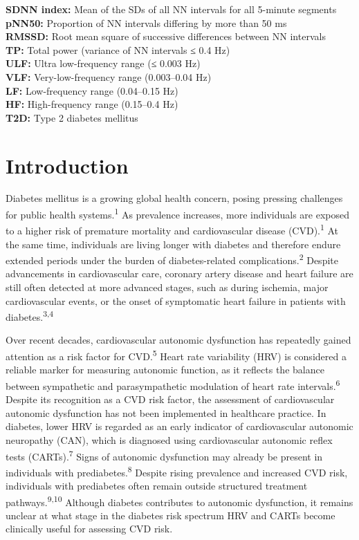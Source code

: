 \documentclass[
  letterpaper,
  headsepline=true,
  open=any]{scrbook}
\begin{document}
\textbf{SDNN index:} Mean of the SDs of all NN intervals for all
5-minute segments\\
\textbf{pNN50:} Proportion of NN intervals differing by more than 50
ms\\
\textbf{RMSSD:} Root mean square of successive differences between NN
intervals\\
\textbf{TP:} Total power (variance of NN intervals ≤ 0.4 Hz)\\
\textbf{ULF:} Ultra low-frequency range (≤ 0.003 Hz)\\
\textbf{VLF:} Very-low-frequency range (0.003--0.04 Hz)\\
\textbf{LF:} Low-frequency range (0.04--0.15 Hz)\\
\textbf{HF:} High-frequency range (0.15--0.4 Hz)\\
\textbf{T2D:} Type 2 diabetes mellitus


\hypertarget{introduction}{%
\chapter{Introduction}\label{introduction}}

\newpage

Diabetes mellitus is a growing global health concern, posing pressing
challenges for public health systems.\textsuperscript{1} As prevalence
increases, more individuals are exposed to a higher risk of premature
mortality and cardiovascular disease (CVD).\textsuperscript{1} At the
same time, individuals are living longer with diabetes and therefore
endure extended periods under the burden of diabetes-related
complications.\textsuperscript{2} Despite advancements in cardiovascular
care, coronary artery disease and heart failure are still often detected
at more advanced stages, such as during ischemia, major cardiovascular
events, or the onset of symptomatic heart failure in patients with
diabetes.\textsuperscript{3,4}

Over recent decades, cardiovascular autonomic dysfunction has repeatedly
gained attention as a risk factor for CVD.\textsuperscript{5} Heart rate
variability (HRV) is considered a reliable marker for measuring
autonomic function, as it reflects the balance between sympathetic and
parasympathetic modulation of heart rate intervals.\textsuperscript{6}
Despite its recognition as a CVD risk factor, the assessment of
cardiovascular autonomic dysfunction has not been implemented in
healthcare practice. In diabetes, lower HRV is regarded as an early
indicator of cardiovascular autonomic neuropathy (CAN), which is
diagnosed using cardiovascular autonomic reflex tests
(CARTs).\textsuperscript{7} Signs of autonomic dysfunction may already
be present in individuals with prediabetes.\textsuperscript{8} Despite
rising prevalence and increased CVD risk, individuals with prediabetes
often remain outside structured treatment
pathways.\textsuperscript{9,10} Although diabetes contributes to
autonomic dysfunction, it remains unclear at what stage in the diabetes
risk spectrum HRV and CARTs become clinically useful for assessing CVD
risk.
\end{document}
